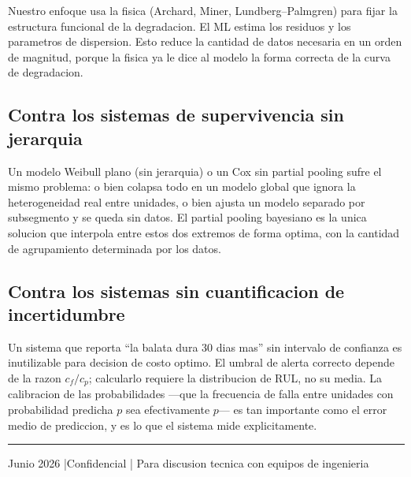 \documentclass[11pt,a4paper]{article}
\begin{document}
Nuestro enfoque usa la fisica (Archard, Miner, Lundberg--Palmgren) para
fijar la estructura funcional de la degradacion. El ML estima los residuos
y los parametros de dispersion. Esto reduce la cantidad de datos necesaria
en un orden de magnitud, porque la fisica ya le dice al modelo la forma
correcta de la curva de degradacion.

\subsection{Contra los sistemas de supervivencia sin jerarquia}

Un modelo Weibull plano (sin jerarquia) o un Cox sin partial pooling
sufre el mismo problema: o bien colapsa todo en un modelo global que
ignora la heterogeneidad real entre unidades, o bien ajusta un modelo
separado por subsegmento y se queda sin datos. El partial pooling bayesiano
es la unica solucion que interpola entre estos dos extremos de forma
optima, con la cantidad de agrupamiento determinada por los datos.

\subsection{Contra los sistemas sin cuantificacion de incertidumbre}

Un sistema que reporta ``la balata dura 30 dias mas'' sin intervalo de
confianza es inutilizable para decision de costo optimo. El umbral de
alerta correcto depende de la razon $c_f / c_p$; calcularlo requiere
la distribucion de RUL, no su media. La calibracion de las probabilidades
---que la frecuencia de falla entre unidades con probabilidad predicha
$p$ sea efectivamente $p$--- es tan importante como el error medio de
prediccion, y es lo que el sistema mide explicitamente.

\vspace{0.8cm}

{\color{rule}\rule{\linewidth}{0.4pt}}

\vspace{0.4cm}

\begin{center}
{\small\color{muted}
Junio 2026 \quad|\quad Confidencial \quad|\quad
Para discusion tecnica con equipos de ingenieria}
\end{center}
\end{document}
